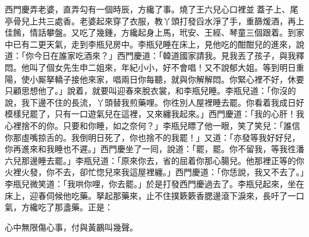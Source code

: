 西門慶弄老婆，直弄勾有一個時辰，方纔了事。燒了王六兒心口裡並𣬼蓋子上、尾亭骨兒上共三處香。老婆起來穿了衣服，教丫頭打發舀水淨了手，重篩煖酒，再上佳餚，情話攀盤。又吃了幾鍾，方纔起身上馬，玳安、王經、琴童三個跟着。到家中已有二更天氣，走到李瓶兒房中。李瓶兒睡在床上，見他吃的酣酣兒的進來，說道：「你今日在誰家吃酒來？」西門慶道：「韓道國家請我。見我丟了孩子，與我釋悶。他叫了個女先生申二姐來，年紀小小，好不會唱！又不說郁大姐。等到明日重陽，使小厮拏轎子接他來家，唱兩日你每聽，就與你解解悶。你緊心裡不好，休要只顧思想他了。」{}說着，就要叫迎春來脫衣裳，和李瓶兒睡。李瓶兒道：「你沒的說，我下邊不住的長流，丫頭替我煎藥哩。你徃別人屋裡睡去罷。你看着我成日好模樣兒罷了，只有一口遊氣兒在這裡，又來纏我起來。」西門慶道：「我的心肝！我心裡捨不的你。只要和你睡，如之奈何？」李瓶兒瞟了他一眼，笑了笑兒：「誰信你那虛嘴掠舌的。我倒明日死了，你也捨不的我罷！」又道：「亦發等我好好兒，你再進來和我睡也不遲。」西門慶坐了一囘，說道：「罷，罷。你不留我，等我徃潘六兒那邊睡去罷。」李瓶兒道：「原來你去，省的屈着你那心腸兒。他那裡正等的你火裡火發，你不去，卻忙惚兒來我這屋裡纏。」{}西門慶道：「你恁說，我又不去了。」李瓶兒微笑道：「我哄你哩，你去罷。」於是打發西門慶過去了。李瓶兒起來，坐在床上，迎春伺候他吃藥。拏起那藥來，止不住撲簌簌香腮邊滾下淚來，長吁了一口氣，{}方纔吃了那盞藥。正是：

\begin{myquote}
心中無限傷心事，付與黃鸝叫幾聲。
\end{myquote}

